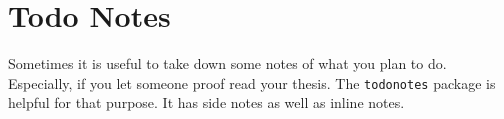 \section{Todo Notes}
\label{sec:todo-notes}
Sometimes it is useful to take down some notes of what you plan to do. Especially, if you let someone proof read your thesis. The \texttt{todonotes} package is helpful for that purpose. It has side notes as well as inline notes.\\
